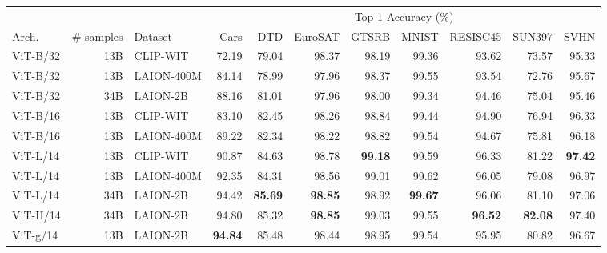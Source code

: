 \begin{appendix}
\begin{table}
\begin{tabular}{lrlrrrrrrrr}
& & & \multicolumn{8}{c}{Top-1 Accuracy (\%)} \\
Arch. & \# samples &  Dataset & Cars & DTD & EuroSAT & GTSRB & MNIST & RESISC45 & SUN397 & SVHN \\                                      
\midrule                                                                                    ViT-B/32 &          13B &    CLIP-WIT &     72.19 &    79.04 &        98.37 &      98.19 &      99.36 &         93.62 &       73.57 &     95.33 \\                                                  
 ViT-B/32 &          13B &  LAION-400M &     84.14 &    78.99 &        97.96 &      98.37 &      99.55 &         93.54 &       72.76 &     95.67 \\                                                  
 ViT-B/32 &          34B &    LAION-2B &     88.16 &    81.01 &        97.96 &      98.00 &      99.34 &         94.46 &       75.04 &     95.46 \\                             ViT-B/16 &          13B &    CLIP-WIT &     83.10 &    82.45 &        98.26 &      98.84 &      99.44 &         94.90 &       76.94 &     96.33 \\                                                  
ViT-B/16 &          13B &  LAION-400M &     89.22 &    82.34 &        98.22 &      98.82 &      99.54 &         94.67 &       75.81 &     96.18 \\                                                                      
ViT-L/14 &          13B &    CLIP-WIT &     90.87 &    84.63 &        98.78 &      \textbf{99.18} &     99.59 &         96.33 &       81.22 &     \textbf{97.42} \\                                                  
 ViT-L/14 &          13B &  LAION-400M &     92.35 &    84.31 &        98.56 &      99.01 &      99.62 &         96.05 &       79.08 &     96.97 \\                                                  
 ViT-L/14 &          34B &    LAION-2B &     94.42 &    \textbf{85.69} &        \textbf{98.85} &      98.92 &      \textbf{99.67} &         96.06 &       81.10 &     97.06 \\
  ViT-H/14 &          34B &    LAION-2B &     94.80 &    85.32 &        \textbf{98.85} &      99.03 &      99.55 &         \textbf{96.52} &       \textbf{82.08} &     97.40 \\                                                  
 ViT-g/14 &          13B &    LAION-2B &     \textbf{94.84} &    85.48 &        98.44 &      98.95 &      99.54 &         95.95 &       80.82 &     96.67 \\                          

\end{tabular}
\end{table}
\end{appendix}
